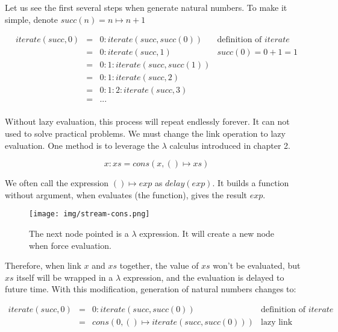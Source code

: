 \documentclass{article}
\begin{document}
Let us see the first several steps when generate natural numbers. To make it simple, denote $succ(n) = n \mapsto n +1$

\[
\begin{array}{rcll}
iterate(succ, 0) & = & 0 : iterate(succ, succ(0)) & \text{definition of } iterate\\
                 & = & 0 : iterate(succ, 1) & succ(0) = 0 + 1 = 1 \\
                 & = & 0 : 1 : iterate(succ, succ(1)) & \\
                 & = & 0 : 1 : iterate(succ, 2) & \\
                 & = & 0 : 1 : 2 : iterate(succ, 3) & \\
                 & = & ... & \\
\end{array}
\]

Without lazy evaluation, this process will repeat endlessly forever. It can not used to solve practical problems. We must change the link operation to lazy evaluation. One method is to leverage the $\lambda$ calculus introduced in chapter 2.

\[
x : xs = cons(x, () \mapsto xs)
\]

We often call the expression $() \mapsto exp$ as $delay(exp)$. It builds a function without argument, when evaluates (the function), gives the result $exp$.

\begin{figure}[htbp]
 \centering
 \texttt{[image: img/stream-cons.png]}
 \caption{The next node pointed is a $\lambda$ expression. It will create a new node when force evaluation.}
 \label{fig:stream-cons}
\end{figure}

Therefore, when link $x$ and $xs$ together, the value of $xs$ won't be evaluated, but $xs$ itself will be wrapped in a $\lambda$ expression, and the evaluation is delayed to future time. With this modification, generation of natural numbers changes to:

\[
\begin{array}{rcll}
iterate(succ, 0) & = & 0 : iterate(succ, succ(0)) & \text{definition of } iterate\\
                 & = & cons(0, () \mapsto iterate(succ, succ(0))) & \text{lazy link} \\
\end{array}
\]
\end{document}
